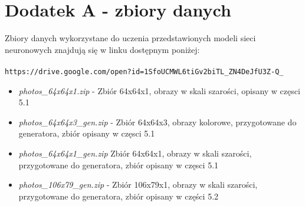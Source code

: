 
\chapter{Dodatek A - zbiory danych} \label{dodatekA}
Zbiory danych wykorzystane do uczenia przedstawionych modeli sieci neuronowych
znajdują się w linku dostępnym poniżej:\\\\

\texttt{https://drive.google.com/open?id=1SfoUCMWL6tiGv2biTL\_ZN4DeJfU3Z-Q\_}

\begin{itemize}
\item  \textit{photos\_64x64x1.zip} - Zbiór 64x64x1, obrazy w skali szarości, opisany w częsci 5.1
\item  \textit{photos\_64x64x3\_gen.zip} - Zbiór 64x64x3, obrazy kolorowe, przygotowane do generatora, zbiór opisany w częsci 5.1
\item  \textit{photos\_64x64x1\_gen.zip} Zbiór 64x64x1, obrazy w skali szarości, przygotowane do generatora, zbiór opisany w częsci 5.1
\item  \textit{photos\_106x79\_gen.zip} - Zbiór 106x79x1, obrazy w skali szarości, przygotowane do generatora, zbiór opisany w części 5.2
\end{itemize}
